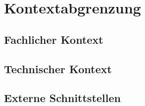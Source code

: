 \chapter{Kontextabgrenzung}

\section{Fachlicher Kontext}

\section{Technischer Kontext}

\section{Externe Schnittstellen}